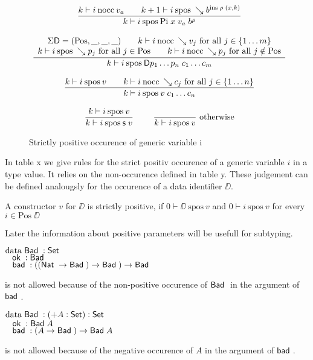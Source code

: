 \newcommand{\spos}[3]{#1\vdash#2\:\mbox{spos}\:#3}

\begin{figure}
\begin{gather*}
\nru{}
{ \nocc{k}{i}{v_a} \qquad \spos{k+1}{i}{\wh \cl{b}{\ins \; \rho \; (x,k)}}}
{\spos{k}{i}{\vpi \; x \; v_a \; \cl{b}{\rho}}  }
\\[2ex]
\ndru{}
{\Sig \DD = (\mbox{Pos},\_,\_,\_) \qquad \nocc{k}{i}{\wh v_j} \mbox{ for all } j \in \{1 \ldots m \}} 
{\spos{k}{i}{\wh p_j} \mbox{ for all } j \in \mbox{Pos} \qquad \nocc{k}{i}{\wh p_j} \mbox{ for all } j \notin \mbox{Pos} } 
{\spos{k}{i}{\DD p_1 \ldots p_n \; c_1 \ldots c_m}}
\\[2ex]
\nru{}
{\spos{k}{i}{v} \qquad \nocc{k}{i}{\wh c_j} \mbox{ for all } j \in \{1 \ldots n \}}
{\spos{k}{i}{v \; c_1 \ldots c_n}}
\\[2ex]
\nru{}
{\spos{k}{i}{v}}
{\spos{k}{i}{\s v}}
\qquad
\nrux{}
{}
{\spos{k}{i}{v}}
{\mbox{otherwise}}
\end{gather*}
\caption{Strictly positive occurence of generic variable i}
\end{figure}

In table x we give rules for the strict positiv occurence of a generic variable $i$ in a type value.
It relies on the non-occurence defined in table y.
These judgement can be defined analougsly for the occurence of a data identifier $\DD$.
\begin{definition}
A constructor $v$ for $\DD$ is strictly positive, if $\spos{0}{\DD}{v}$ and 
$\spos{0}{i}{v}$ for every $i \in \mbox{Pos}\; {\DD}$  
\end{definition}

Later the information about positive parameters will be usefull for subtyping.

\begin{bsp}
$\mathrm{data}\; \mathsf{Bad}\; : \mathsf{Set} $ \\
$\hspace*{3mm} \mathsf{ok}\; : \mathsf{Bad}\;$\\
$\hspace*{3mm} \mathsf{bad}\; : ((\mathsf{Nat}\; \rightarrow \mathsf{Bad}\;) \rightarrow \mathsf{Bad}\;) \rightarrow \mathsf{Bad}\;  $
\end{bsp}
is not allowed because of the non-positive occurence of $\mathsf{Bad}\;$ in the argument of $\mathsf{bad}\;$.

\begin{bsp}
$\mathrm{data}\; \mathsf{Bad}\; : ( + A : \mathsf{Set} ) : \mathsf{Set} $\\
$\hspace*{3mm} \mathsf{ok}\; : \mathsf{Bad}\; A$\\
$\hspace*{3mm} \mathsf{bad}\; : (A \rightarrow \mathsf{Bad}\;) \rightarrow \mathsf{Bad}\; A$
\end{bsp}
is not allowed because of the negative occurence of $A$ in the argument of $\mathsf{bad}\;$.

